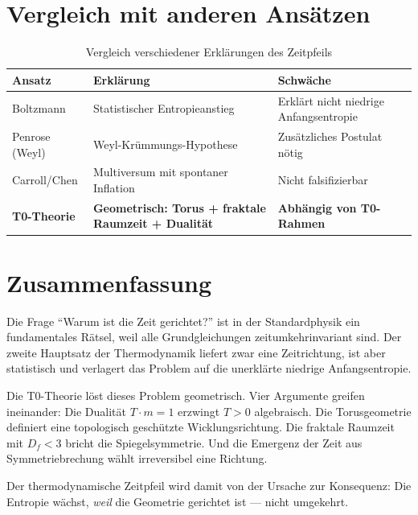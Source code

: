 \section{Vergleich mit anderen Ansätzen}

\begin{table}[htbp]
	\centering
	\begin{tabular}{p{3.5cm}p{4.5cm}p{4.5cm}}
		\toprule
		\textbf{Ansatz} & \textbf{Erklärung} & \textbf{Schwäche} \\
		\midrule
		Boltzmann & Statistischer Entropieanstieg & Erklärt nicht niedrige Anfangsentropie \\
		Penrose (Weyl) & Weyl-Krümmungs-Hypothese & Zusätzliches Postulat nötig \\
		Carroll/Chen & Multiversum mit spontaner Inflation & Nicht falsifizierbar \\
		\textbf{T0-Theorie} & \textbf{Geometrisch: Torus + fraktale Raumzeit + Dualität} & \textbf{Abhängig von T0-Rahmen} \\
		\bottomrule
	\end{tabular}
	\caption{Vergleich verschiedener Erklärungen des Zeitpfeils}
\end{table}

\section{Zusammenfassung}

Die Frage ``Warum ist die Zeit gerichtet?'' ist in der Standardphysik ein fundamentales Rätsel, weil alle Grundgleichungen zeitumkehrinvariant sind. Der zweite Hauptsatz der Thermodynamik liefert zwar eine Zeitrichtung, ist aber statistisch und verlagert das Problem auf die unerklärte niedrige Anfangsentropie.

Die T0-Theorie löst dieses Problem geometrisch. Vier Argumente greifen ineinander: Die Dualität $T \cdot m = 1$ erzwingt $T > 0$ algebraisch. Die Torusgeometrie definiert eine topologisch geschützte Wicklungsrichtung. Die fraktale Raumzeit mit $D_f < 3$ bricht die Spiegelsymmetrie. Und die Emergenz der Zeit aus Symmetriebrechung wählt irreversibel eine Richtung.

Der thermodynamische Zeitpfeil wird damit von der Ursache zur Konsequenz: Die Entropie wächst, \emph{weil} die Geometrie gerichtet ist --- nicht umgekehrt.


